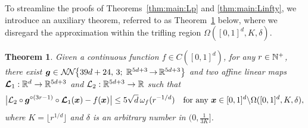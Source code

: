 \documentclass[nohyperref]{article}
\theoremstyle{plain}
\newtheorem{theorem}{Theorem}[section]
\theoremstyle{definition}
\theoremstyle{remark}
\begin{document}
To streamline the proofs of Theorems~\ref{thm:main:Lp} and \ref{thm:main:Linfty}, we introduce an auxiliary theorem, referred to as Theorem~\ref{thm:main:gap} below, where we disregard the approximation within the trifling region $\Omega([0,1]^d,K,\delta)$.
\begin{theorem}
	\label{thm:main:gap}
	Given  a continuous function $f\in C([0,1]^d)$, for any $r\in \N^+$,
	there exist $\bmg\in \nn[\big]{39d+24}{3}{5d+3}{5d+3}$
	and two affine linear maps
	$\bmcalL_1:\R^d\to\R^{5d+3}$ and $\calL_2:\R^{5d+3}\to\R$
	such that 
	\begin{equation*}
		\big|{\mathcal{L}}_2\circ {\bm{g}}^{\circ (3r-1)}\circ {\bm{\mathcal{L}}}_1({\bm{x}})-f({\bm{x}})\big|\le 5\sqrt{d}\,\omega_f(r^{-1/d})\quad \textnormal{for any ${\bm{x}}\in [0,1]^d\backslash\Omega([0,1]^d,K,\delta)$},
	\end{equation*}
	where $K=\lfloor r^{1/d}\rfloor$ and $\delta$ is an arbitrary number in $(0,\tfrac{1}{3K}]$.
\end{theorem}
\end{document}

